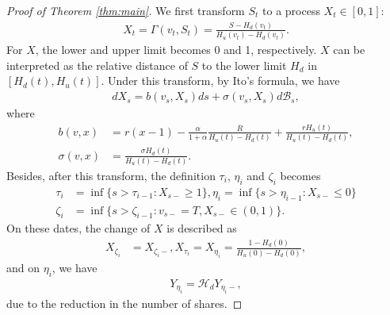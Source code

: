 \documentclass[11pt]{article}%
\numberwithin{equation}{section}
\theoremstyle{plain}
\begin{document}
\begin{appendices}
\begin{proof}[Proof of Theorem \ref{thm:main}]
	We first transform $S_t$ to a process $X_t\in[0,1]$:
	\begin{align*}
		X_t=\Gamma(v_t,S_t)=\frac{S-H_d(v_t)}{H_u(v_t)-H_d(v_t)}.
	\end{align*}
	For $X$, the lower and upper limit becomes 0 and 1, respectively. $X$ can be interpreted as the relative distance of $S$ to the lower limit $H_d$ in $[H_d(t),H_u(t)]$. Under this transform, by Ito's formula, we have
	\begin{align*}
		dX_s=b(v_s,X_s)ds+\sigma(v_s,X_s)d\mathcal{B}_s,
	\end{align*}
	where
	\begin{align*}
		b(v,x)&=r(x-1)-\frac{\alpha}{1+\alpha}\frac{R}{H_u(t)-H_d(t)}+\frac{rH_u(t)}{H_u(t)-H_d(t)},\\
		\sigma(v,x)&=\frac{\sigma H_d(t)}{H_u(t)-H_d(t)}.
	\end{align*}
	Besides, after this transform, the definition $\tau_i$, $\eta_i$ and $\zeta_i$ becomes
	\begin{align*}
		\tau_i&=\inf\{s>\tau_{i-1}:X_{s-}\ge 1\},\eta_i=\inf\{s>\eta_{i-1}:X_{s-}\le 0\}\\
		\zeta_i&=\inf\{s>\zeta_{i-1}:v_{s-}=T,X_{s-}\in(0,1)\}.
	\end{align*}
	On these dates, the change of $X$ is described as
	\begin{align*}
		X_{\zeta_i}&=X_{\zeta_i-}, X_{\tau_i}=X_{\eta_i}=\frac{1-H_d(0)}{H_u(0)-H_d(0)},
	\end{align*}
	and on $\eta_i$, we have
	\begin{align*}
		Y_{\eta_i}=\mathcal{H}_d Y_{\eta_i-},
	\end{align*}
	due to the reduction in the number of shares.


\end{proof}
\end{appendices}
\end{document}
